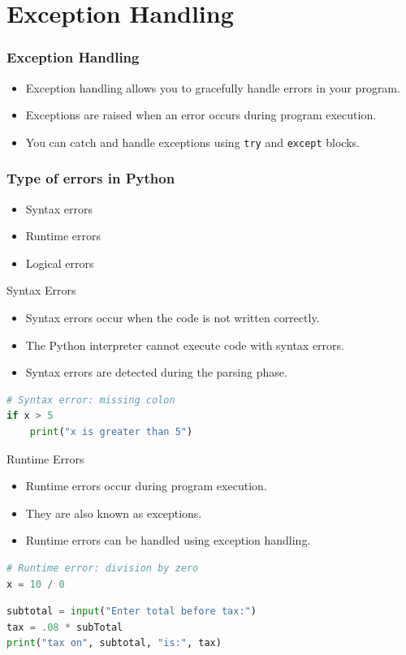 \section{Exception Handling}
\begin{frame}
    \frametitle{Exception Handling}
    \begin{itemize}
        \item Exception handling allows you to gracefully handle errors in your program.
        \item Exceptions are raised when an error occurs during program execution.
        \item You can catch and handle exceptions using \texttt{try} and \texttt{except} blocks.
    \end{itemize}
\end{frame} 

\begin{frame}
    \frametitle{Type of errors in Python}
    \begin{itemize}
        \item Syntax errors
        \item Runtime errors
        \item Logical errors
    \end{itemize}   
\end{frame} 

\begin{frame}[fragile]{Syntax Errors}
    \begin{itemize}
        \item Syntax errors occur when the code is not written correctly.
        \item The Python interpreter cannot execute code with syntax errors.
        \item Syntax errors are detected during the parsing phase.
    \end{itemize}
    \begin{lstlisting}[language=Python]
# Syntax error: missing colon
if x > 5
    print("x is greater than 5")
    \end{lstlisting}
\end{frame} 

\begin{frame}[fragile]{Runtime Errors}
    \begin{itemize}
        \item Runtime errors occur during program execution.
        \item They are also known as exceptions.
        \item Runtime errors can be handled using exception handling.
    \end{itemize}
    \begin{lstlisting}[language=Python]
# Runtime error: division by zero
x = 10 / 0
    \end{lstlisting}
    \begin{lstlisting}[language=Python]
subtotal = input("Enter total before tax:")
tax = .08 * subTotal
print("tax on", subtotal, "is:", tax)
\end{lstlisting}
\end{frame} 

